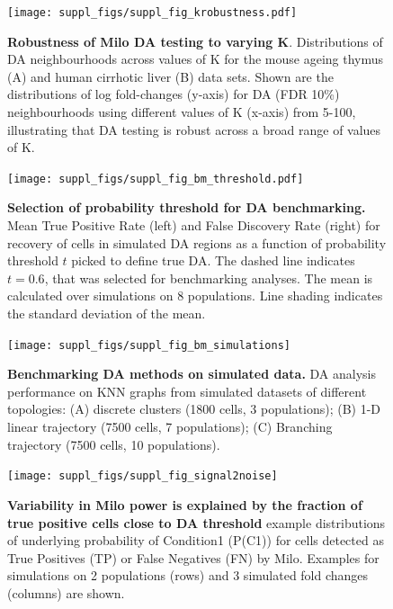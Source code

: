 \documentclass[
]{article}
\begin{document}
\begin{figure}
\centering
\texttt{[image: suppl\_figs/suppl\_fig\_krobustness.pdf]}
\caption{\label{fig:sup-fig-robustness}\textbf{Robustness of Milo DA testing to varying K}. Distributions of DA neighbourhoods across values of K for the mouse ageing thymus (A) and human cirrhotic liver (B) data sets. Shown are the distributions of log fold-changes (y-axis) for DA (FDR 10\%) neighbourhoods using different values of K (x-axis) from 5-100, illustrating that DA testing is robust across a broad range of values of K.}
\end{figure}



\begin{figure}
\centering
\texttt{[image: suppl\_figs/suppl\_fig\_bm\_threshold.pdf]}
\caption{\label{fig:sup-fig-bm-threshold}\textbf{Selection of probability threshold for DA benchmarking.} Mean True Positive Rate (left) and False Discovery Rate (right) for recovery of cells in simulated DA regions as a function of probability threshold \(t\) picked to define true DA. The dashed line indicates \(t = 0.6\), that was selected for benchmarking analyses. The mean is calculated over simulations on 8 populations. Line shading indicates the standard deviation of the mean.}
\end{figure}



\begin{figure}
\texttt{[image: suppl\_figs/suppl\_fig\_bm\_simulations]} \caption{\textbf{Benchmarking DA methods on simulated data.} DA analysis performance on KNN graphs from simulated datasets of different topologies: (A) discrete clusters (1800 cells, 3 populations); (B) 1-D linear trajectory (7500 cells, 7 populations); (C) Branching trajectory (7500 cells, 10 populations).}\label{fig:sup-fig-bm-simulations}
\end{figure}



\begin{figure}
\texttt{[image: suppl\_figs/suppl\_fig\_signal2noise]} \caption{\textbf{Variability in Milo power is explained by the fraction of true positive cells close to DA threshold} example distributions of underlying probability of Condition1 (P(C1)) for cells detected as True Positives (TP) or False Negatives (FN) by Milo. Examples for simulations on 2 populations (rows) and 3 simulated fold changes (columns) are shown.}\label{fig:sup-fig-bm-signal}
\end{figure}
\end{document}
